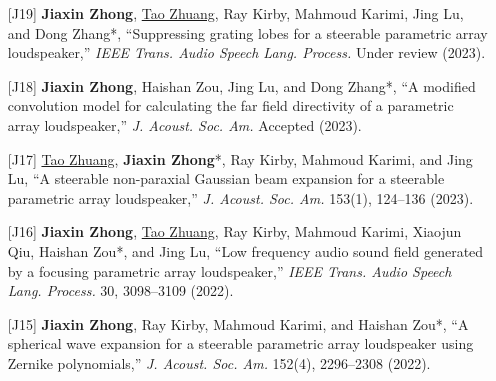 \documentclass[10pt,a4paper,ragged2e,withhyper]{altacv}
\newcommand{\PubJournal}[1]{\textit{#1}}
\newcommand{\PubTitle}[1]{``{#1,}''}
\newcommand{\PubCorAuthor}[1]{#1*}
\newcommand{\PubMe}[1]{\textbf{#1}}
\begin{document}
\divider



\begin{itemize}[leftmargin = 30pt]
    \justifying 
    \item[{[J19]}]
        \PubMe{Jiaxin Zhong}, \underline{Tao Zhuang}, Ray Kirby, Mahmoud Karimi, Jing Lu, and \PubCorAuthor{Dong Zhang},
        \PubTitle{Suppressing grating lobes for a steerable parametric array loudspeaker}
        \PubJournal{IEEE Trans. Audio Speech Lang. Process.}
        Under review (2023).
        
    \item[{[J18]}]
        \PubMe{Jiaxin Zhong}, Haishan Zou, Jing Lu, and \PubCorAuthor{Dong Zhang},
        \PubTitle{A modified convolution model for calculating the far field directivity of a parametric array loudspeaker}
        \PubJournal{J. Acoust. Soc. Am.}
        Accepted (2023).


    \item[{[J17]}]
        \underline{Tao Zhuang}, 
        \PubCorAuthor{\PubMe{Jiaxin Zhong}},
        Ray Kirby, Mahmoud Karimi, and Jing Lu, 
        \PubTitle{A steerable non-paraxial Gaussian beam expansion for a steerable parametric array loudspeaker}
        \PubJournal{J. Acoust. Soc. Am.}
        153(1), 124--136 (2023).
        \href{https://doi.org/10.1121/10.0016816}{\color{accent}\aiDoi}
        \href{https://github.com/JiaxinZhong/JiaxinZhong.github.io/raw/master/publications/journal/Zhuang2023-JASA-PAL_steerable_GBE.pdf}{\color{accent}\faFilePdf[regular]}

    \item[{[J16]}]
        \PubMe{Jiaxin Zhong}, \underline{Tao Zhuang}, Ray Kirby, Mahmoud Karimi, Xiaojun Qiu, \PubCorAuthor{Haishan Zou}, and Jing Lu,
        \PubTitle{Low frequency audio sound field generated by a focusing parametric array loudspeaker}
        \PubJournal{IEEE Trans. Audio Speech Lang. Process.}
        30, 3098--3109 (2022).
        \href{https://doi.org/10.1109/TASLP.2022.3209944}{\color{accent}\aiDoi}
        \href{https://github.com/JiaxinZhong/JiaxinZhong.github.io/raw/master/publications/journal/Zhong2022-IEEETASLP-Focusing_PAL.pdf}{\color{accent}\faFilePdf[regular]}

    \item[{[J15]}]
        \PubMe{Jiaxin Zhong}, Ray Kirby, Mahmoud Karimi, and \PubCorAuthor{Haishan Zou},
        \PubTitle{A spherical wave expansion for a steerable parametric array loudspeaker using Zernike polynomials} 
        \PubJournal{J. Acoust. Soc. Am.} 
        152(4), 2296--2308 (2022).
        \href{https://doi.org/10.1121/10.0014832}{\color{accent}\aiDoi}
        \href{https://github.com/JiaxinZhong/JiaxinZhong.github.io/raw/master/publications/journal/Zhong2022-JASA-PAL_Zernike.pdf}{\color{accent}\faFilePdf[regular]}


\end{itemize}
\end{document}
